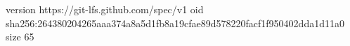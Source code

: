 version https://git-lfs.github.com/spec/v1
oid sha256:264380204265aaa374a8a5d1fb8a19cfae89d578220facf1f950402dda1d11a0
size 65
